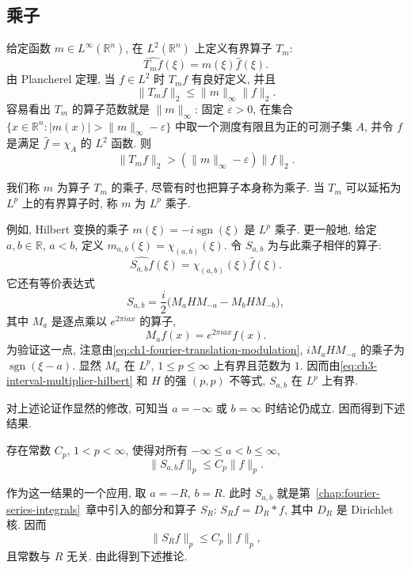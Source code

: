 \subsection{乘子}
\label{sec:ch3-multipliers}

给定函数 $m\in L^\infty(\mathbb R^n)$, 在 $L^2(\mathbb R^n)$ 上定义有界算子 $T_m$:
\begin{equation}
\label{eq:ch3-multiplier-definition}
 \widehat{T_mf}(\xi)=m(\xi)\widehat f(\xi).
\end{equation}
由 Plancherel 定理, 当 $f\in L^2$ 时 $T_mf$ 有良好定义, 并且
\[
 \|T_mf\|_2\le\|m\|_\infty\|f\|_2.
\]
容易看出 $T_m$ 的算子范数就是 $\|m\|_\infty$: 固定 $\varepsilon>0$, 在集合 $\{x\in\mathbb R^n:|m(x)|>\|m\|_\infty-\varepsilon\}$ 中取一个测度有限且为正的可测子集 $A$, 并令 $f$ 是满足 $\widehat f=\chi_A$ 的 $L^2$ 函数. 则
\[
 \|T_mf\|_2>(\|m\|_\infty-\varepsilon)\|f\|_2.
\]

我们称 $m$ 为算子 $T_m$ 的乘子, 尽管有时也把算子本身称为乘子. 当 $T_m$ 可以延拓为 $L^p$ 上的有界算子时, 称 $m$ 为 $L^p$ 乘子.

例如, Hilbert 变换的乘子 $m(\xi)=-i\operatorname{sgn}(\xi)$ 是 $L^p$ 乘子. 更一般地, 给定 $a,b\in\mathbb R$, $a<b$, 定义 $m_{a,b}(\xi)=\chi_{(a,b)}(\xi)$. 令 $S_{a,b}$ 为与此乘子相伴的算子:
\[
 \widehat{S_{a,b}f}(\xi)=\chi_{(a,b)}(\xi)\widehat f(\xi).
\]
它还有等价表达式
\begin{equation}
\label{eq:ch3-interval-multiplier-hilbert}
 S_{a,b}=\frac i2\bigl(M_aHM_{-a}-M_bHM_{-b}\bigr),
\end{equation}
其中 $M_a$ 是逐点乘以 $e^{2\pi iax}$ 的算子,
\[
 M_af(x)=e^{2\pi iax}f(x).
\]
为验证这一点, 注意由\eqref{eq:ch1-fourier-translation-modulation}, $iM_aHM_{-a}$ 的乘子为 $\operatorname{sgn}(\xi-a)$. 显然 $M_a$ 在 $L^p$, $1\le p\le\infty$ 上有界且范数为 $1$. 因而由\eqref{eq:ch3-interval-multiplier-hilbert} 和 $H$ 的强 $(p,p)$ 不等式, $S_{a,b}$ 在 $L^p$ 上有界.

\hypertarget{chapter-03-page-071}{}
对上述论证作显然的修改, 可知当 $a=-\infty$ 或 $b=\infty$ 时结论仍成立. 因而得到下述结果.

\begin{Proposition}
\label{prop:ch3-interval-multiplier-bound}
存在常数 $C_p$, $1<p<\infty$, 使得对所有 $-\infty\le a<b\le\infty$,
\[
 \|S_{a,b}f\|_p\le C_p\|f\|_p.
\]
\end{Proposition}

作为这一结果的一个应用, 取 $a=-R$, $b=R$. 此时 $S_{a,b}$ 就是第~\ref{chap:fourier-series-integrals}~章中引入的部分和算子 $S_R$: $S_Rf=D_R*f$, 其中 $D_R$ 是 Dirichlet 核. 因而
\[
 \|S_Rf\|_p\le C_p\|f\|_p,
\]
且常数与 $R$ 无关. 由此得到下述推论.


